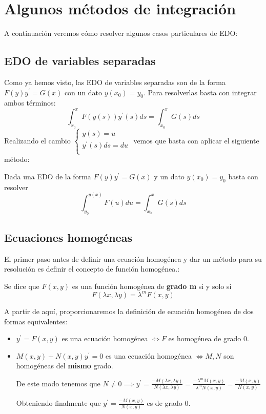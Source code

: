 \section{Algunos métodos de integración}
A continuación veremos cómo resolver algunos casos particulares de EDO:

\subsection{EDO de variables separadas}
Como ya hemos visto, las EDO de variables separadas son de la forma $F(y)y^\prime = G(x)$ con un dato $y(x_0) = y_0$.
Para resolverlas basta con integrar ambos términos:
$$\int_{x_0}^x F(y(s))y^\prime(s)ds = \int_{x_0}^x G(s)ds$$
Realizando el cambio
$\left\lbrace
  \begin{array}{l}
     y(s) = u \\
     y^\prime(s)ds = du  \\
  \end{array}
  \right.
$ vemos que basta con aplicar el siguiente método:

\begin{method}
Dada una EDO de la forma $F(y)y^\prime = G(x)$ y un dato $y(x_0) = y_0$ basta con resolver $$\int_{y_0}^{y(x)} F(u)du = \int_{x_0}^x G(s)ds$$
\end{method}

\subsection{Ecuaciones homogéneas}
El primer paso antes de definir una ecuación homogénea y dar un método para su resolución es definir el concepto de función homogénea.:

\begin{definition}
Se dice que $F(x,y)$ es una función homogénea de \textbf{grado m} si y solo si
$$F(\lambda x, \lambda y) = \lambda^m F(x,y)$$
\end{definition}

A partir de aquí, proporcionaremos la definición de ecuación homogénea de dos formas equivalentes:
\begin{definition}
\begin{itemize}
\item $y^\prime = F(x,y)$ es una ecuación homogénea $\iff F$ es homogénea de grado $0$.
\item $M(x,y)+N(x,y)y^\prime = 0$ es una ecuación homogénea $\iff M,N$ son homogéneas del \textbf{mismo} grado.

De este modo tenemos que $N\neq 0 \implies y^\prime = \frac{-M(\lambda x,\lambda y)}{N(\lambda x,\lambda y)} = \frac{-\lambda^mM(x,y)}{\lambda^mN(x,y)} = \frac{-M(x,y)}{N(x,y)}$

Obteniendo finalmente que $y^\prime = \frac{-M(x,y)}{N(x,y)}$ es de grado $0$.
\end{itemize}
\end{definition}

